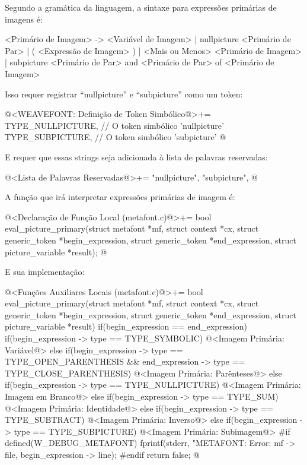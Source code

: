 {{{{{{

Segundo a gramática da linguagem, a sintaxe para expressões primárias
de imagens é:

\alinhaverbatim
<Primário de Imagem> -> <Variável de Imagem> |
                        nullpicture <Primário de Par> |
                        ( <Expressão de Imagem> ) |
                        <Mais ou Menos> <Primário de Imagem> |
                        subpicture <Primário de Par> and <Primário de Par> of
                                   <Primário de Imagem>
\alinhanormal

Isso requer registrar ``nullpicture'' e ``subpicture'' como um token:

\iniciocodigo
@<WEAVEFONT: Definição de Token Simbólico@>+=
TYPE_NULLPICTURE,        // O token simbólico 'nullpicture'
TYPE_SUBPICTURE,         // O token simbólico 'subpicture'
@
\fimcodigo

E requer que essas strings seja adicionada à lista de palavras reservadas:

\iniciocodigo
@<Lista de Palavras Reservadas@>+=
"nullpicture", "subpicture",
@
\fimcodigo

A função que irá interpretar expressões primárias de imagem é:

\iniciocodigo
@<Declaração de Função Local (metafont.c)@>+=
bool eval_picture_primary(struct metafont *mf, struct context *cx,
                          struct generic_token *begin_expression,
                          struct generic_token *end_expression,
                          struct picture_variable *result);
@
\fimcodigo

E sua implementação:

\iniciocodigo
@<Funções Auxiliares Locais (metafont.c)@>+=
bool eval_picture_primary(struct metafont *mf, struct context *cx,
                         struct generic_token *begin_expression,
                         struct generic_token *end_expression,
                         struct picture_variable *result){
  if(begin_expression == end_expression){
    if(begin_expression -> type == TYPE_SYMBOLIC){
      @<Imagem Primária: Variável@>
    }
  }
  else{
    if(begin_expression -> type == TYPE_OPEN_PARENTHESIS &&
      end_expression -> type == TYPE_CLOSE_PARENTHESIS){
      @<Imagem Primária: Parênteses@>
    }
    else if(begin_expression -> type == TYPE_NULLPICTURE){
      @<Imagem Primária: Imagem em Branco@>
    }
    else if(begin_expression -> type == TYPE_SUM){
      @<Imagem Primária: Identidade@>
    }
    else if(begin_expression -> type == TYPE_SUBTRACT){
      @<Imagem Primária: Inverso@>
    }
    else if(begin_expression -> type == TYPE_SUBPICTURE){
      @<Imagem Primária: Subimagem@>
    }
  }
#if defined(W_DEBUG_METAFONT)
  fprintf(stderr, "METAFONT: Error: %
          mf -> file, begin_expression -> line);
#endif
  return false;
}
@
\fimcodigo

}}}}}}

